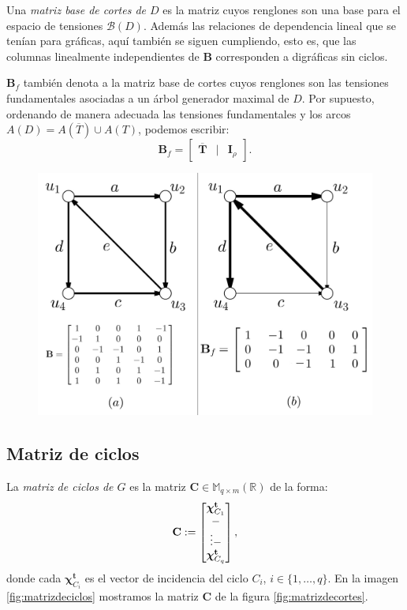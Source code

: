 Una \textit{matriz base de cortes de $D$} es la matriz cuyos renglones son una base para el espacio de tensiones $\mathcal{B}(D)$. Además las relaciones de dependencia lineal que se tenían para gráficas, aquí también se siguen cumpliendo, esto es, que las columnas linealmente independientes de $\mathbf{B}$ corresponden a digráficas sin ciclos.

$\mathbf{B}_{f}$ también denota a la matriz base de cortes cuyos renglones son las tensiones fundamentales asociadas a un árbol generador maximal de $D$. Por supuesto, ordenando de manera adecuada las tensiones fundamentales y los arcos $A(D) = A(\overline{T}) \cup A(T)$, podemos escribir:
$$
\mathbf{B}_{f} = \begin{bmatrix}
\mathbf{\overline{T}}& | & \mathbf{I}_{\rho}
\end{bmatrix}.
$$

\begin{figure}[h]
    \centering
    \includegraphics[scale=0.25]{img/imgchapter4/matrizdecortesdirigidos.jpg}
    \caption{}
    \label{fig:matrizdecortesdirigidos}
\end{figure}

\subsection{Matriz de ciclos}

La \textit{matriz de ciclos de $G$} es la matriz $\mathbf{C} \in \mathbb{M}_{q \times m}(\mathbb{R})$ de la forma: $$\mathbf{C}:= \begin{bmatrix} 
\boldsymbol{\chi}_{C_{1}}^{\mathbf{t}} \\
\-- \\
\vdots
\-- \\
\boldsymbol{\chi}_{C_{q}}^{\mathbf{t}}
\end{bmatrix},
$$ 
donde cada $\boldsymbol{\chi}_{C_{i}}^{\mathbf{t}}$ es el vector de incidencia del ciclo $C_{i}$, $i \in \{1,\ldots, q\}$. En la imagen \ref{fig:matrizdeciclos} mostramos la matriz $\mathbf{C}$ de la figura \ref{fig:matrizdecortes}.

